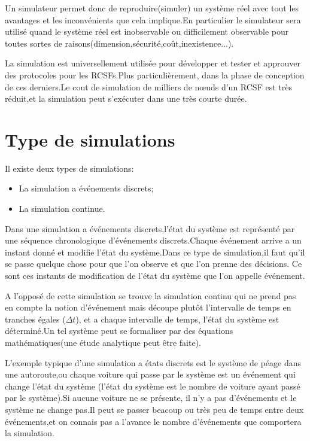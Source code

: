 Un simulateur permet donc de reproduire(simuler) un système réel avec tout les avantages et les inconvénients que cela implique.En particulier le simulateur sera utilisé quand le système réel est inobservable ou difficilement observable pour toutes sortes de raisons(dimension,sécurité,coût,inexistence...).

La simulation est universellement utilisée pour développer et tester et approuver des protocoles pour les RCSFs.Plus particulièrement,  dans la phase de conception de ces derniers.Le cout de simulation de milliers de nœuds d'un RCSF est très réduit,et la simulation peut s'exécuter dans une très courte durée.

\section{Type de simulations}
Il existe deux types de simulations:
\begin{itemize}
\item La simulation a événements discrets;
\item La simulation continue.
\end{itemize}

Dans une simulation a événements discrets,l'état du système est représenté par une séquence chronologique d'événements discrets.Chaque événement arrive a un instant donné et modifie l'état du système.Dans ce type de simulation,il faut qu'il se passe quelque chose pour que l'on observe et que l’on prenne des décisions. Ce sont ces instants de modification de l’état du système que l’on appelle événement.

A l'opposé de cette simulation se trouve la simulation continu qui ne prend pas en compte la notion d'événement mais découpe plutôt l'intervalle de temps en tranches égales ($\Delta t$),
et a chaque intervalle de temps, l'état du système est déterminé.Un tel système peut se formaliser par des équations mathématiques(une étude analytique peut être faite).

L'exemple typique d'une simulation a  états discrets est le système de péage dans une autoroute,ou chaque voiture qui passe par le système est un événement qui change l'état du système (l'état du système est le nombre de voiture ayant passé par le système).Si aucune voiture ne se présente, il n'y a pas d'événements et le système ne change pas.Il peut se passer beacoup ou très peu de temps entre deux événements,et on connais pas a l'avance le nombre d'événements que comportera la simulation. 

